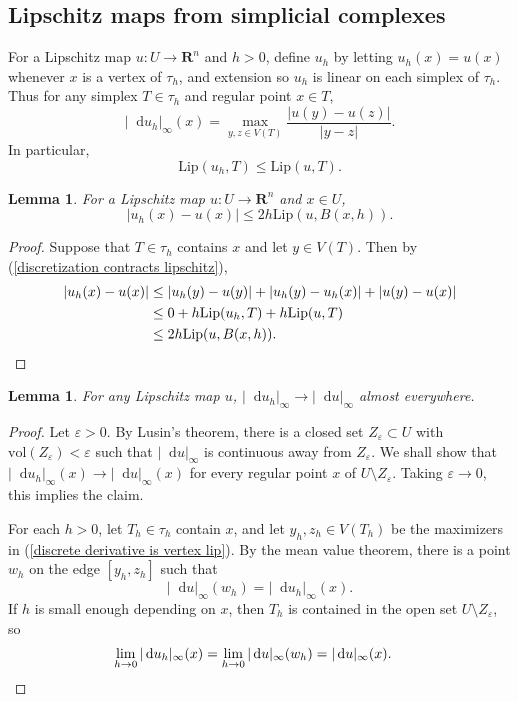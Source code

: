 \documentclass[reqno,11pt]{amsart}
\newcommand{\RR}{\mathbf{R}}
\newcommand*\dif{\mathop{}\!\mathrm{d}}
\newcommand{\vol}{\mathrm{vol}}
\newcommand{\Lip}{\mathrm{Lip}}
\newtheorem{lemma}[theorem]{Lemma}
\theoremstyle{definition}
\numberwithin{equation}{section}
\begin{document}
\subsection{Lipschitz maps from simplicial complexes}
For a Lipschitz map $u: U \to \RR^n$ and $h > 0$, define $u_h$ by letting $u_h(x) = u(x)$ whenever $x$ is a vertex of $\tau_h$, and extension so $u_h$ is linear on each simplex of $\tau_h$.
Thus for any simplex $T \in \tau_h$ and regular point $x \in T$,
\begin{equation}\label{discrete derivative is vertex lip}
|\dif u_h|_\infty(x) = \max_{y, z \in V(T)} \frac{|u(y) - u(z)|}{|y - z|}.
\end{equation}
In particular,
\begin{equation}\label{discretization contracts lipschitz}
\Lip(u_h, T) \leq \Lip(u, T).
\end{equation}

\begin{lemma}
For a Lipschitz map $u: U \to \RR^n$ and $x \in U$,
$$|u_h(x) - u(x)| \leq 2h \Lip(u, B(x, h)).$$
\end{lemma}
\begin{proof}
Suppose that $T \in \tau_h$ contains $x$ and let $y \in V(T)$.
Then by (\ref{discretization contracts lipschitz}),
\begin{align*}
|u_h(x) - u(x)|
&\leq |u_h(y) - u(y)| + |u_h(y) - u_h(x)| + |u(y) - u(x)| \\
&\leq 0 + h\Lip(u_h, T) + h\Lip(u, T) \\
&\leq 2h \Lip(u, B(x, h)). \qedhere
\end{align*}
\end{proof}

\begin{lemma}
For any Lipschitz map $u$, $|\dif u_h|_\infty \to |\dif u|_\infty$ almost everywhere.
\end{lemma}
\begin{proof}
Let $\varepsilon > 0$.
By Lusin's theorem, there is a closed set $Z_\varepsilon \subset U$ with $\vol(Z_\varepsilon) < \varepsilon$ such that $|\dif u|_\infty$ is continuous away from $Z_\varepsilon$.
We shall show that $|\dif u_h|_\infty(x) \to |\dif u|_\infty(x)$ for every regular point $x$ of $U \setminus Z_\varepsilon$.
Taking $\varepsilon \to 0$, this implies the claim.

For each $h > 0$, let $T_h \in \tau_h$ contain $x$, and let $y_h, z_h \in V(T_h)$ be the maximizers in (\ref{discrete derivative is vertex lip}).
By the mean value theorem, there is a point $w_h$ on the edge $[y_h, z_h]$ such that
$$|\dif u|_\infty(w_h) = |\dif u_h|_\infty(x).$$
If $h$ is small enough depending on $x$, then $T_h$ is contained in the open set $U \setminus Z_\varepsilon$, so 
\begin{align*}
\lim_{h \to 0} |\dif u_h|_\infty(x) = \lim_{h \to 0} |\dif u|_\infty(w_h) &= |\dif u|_\infty(x). \qedhere
\end{align*}
\end{proof}
\end{document}
